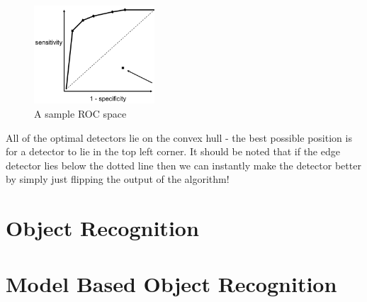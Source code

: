 \documentclass{article}
\begin{document}
	\begin{figure}
		\centering
		\includegraphics[width=0.4\textwidth]{roc_analysis}
		\caption{A sample ROC space}
		\label{fig:roc_analysis}
	\end{figure}
	
	All of the optimal detectors lie on the convex hull - the best possible position is for a detector to lie in the top left corner. It should be noted that if the edge detector lies below the dotted line then we can instantly make the detector better by simply just flipping the output of the algorithm!
		
	\section{Object Recognition}

	\section{Model Based Object Recognition}
	\newpage
	\listoffigures
	\printindex
\end{document}
